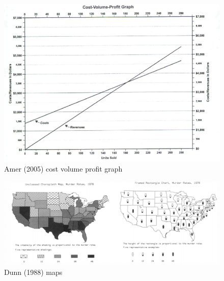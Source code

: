 \documentclass[print]{nuthesis}
\begin{document}
\begin{figure}[tbp]

{\centering \includegraphics[width=0.9\linewidth,]{images/amer-poggendorff-illusion} 

}

\caption{Amer (2005) cost volume profit graph}\label{fig:amer-poggendorff-illusion}
\end{figure}

\begin{figure}[tbp]

{\centering \includegraphics[width=0.9\linewidth,]{images/framed-murder-rate-map} 

}

\caption{Dunn (1988) maps}\label{fig:framed-murder-rate-map}
\end{figure}
\end{document}
